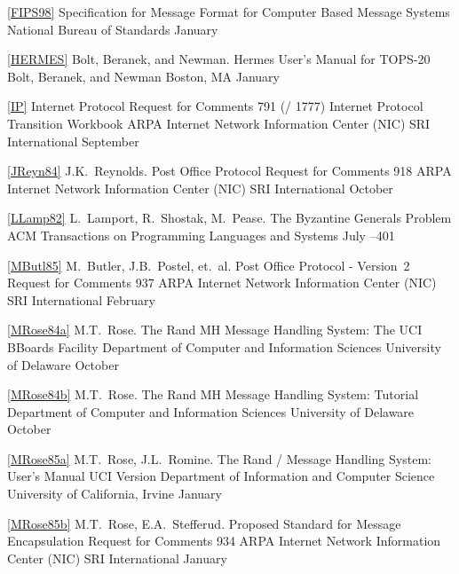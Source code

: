 \ref{FIPS98}
\paper Specification for Message Format for Computer Based Message Systems
\other
\publ National Bureau of Standards
\month January
\endref

\ref{HERMES}
\by Bolt, Beranek, and Newman.
\paper Hermes User's Manual
\paperinfo for TOPS-20
\other
\publ Bolt, Beranek, and Newman
\publaddr Boston, MA
\month January
\endref

\ref{IP}
\paper Internet Protocol
\paperinfo Request for Comments 791 (\milstd/ 1777)
\inbook Internet Protocol Transition Workbook
\publ ARPA Internet Network Information Center (NIC)
\publaddr SRI International
\month September
\endref

\ref{JReyn84}
\by J.K.~Reynolds.
\paper Post Office Protocol
\paperinfo Request for Comments 918
\other
\publ ARPA Internet Network Information Center (NIC)
\publaddr SRI International
\month October
\endref

\ref{LLamp82}
\by L.~Lamport, R.~Shostak, M.~Pease.
\paper The Byzantine Generals Problem
\journal ACM Transactions on Programming Languages and Systems
\month July
--401
\endref

\ref{MButl85}
\by M.~Butler, J.B.~Postel, et.~al.
\paper Post Office Protocol - Version~2
\paperinfo Request for Comments 937
\other
\publ ARPA Internet Network Information Center (NIC)
\publaddr SRI International
\month February
\endref

\ref{MRose84a}
\by M.T.~Rose.
\paper The Rand MH Message Handling System: The UCI BBoards Facility
\other
\publ Department of Computer and Information Sciences
\publaddr University of Delaware
\month October
\endref

\ref{MRose84b}
\by M.T.~Rose.
\paper The Rand MH Message Handling System: Tutorial
\other
\publ Department of Computer and Information Sciences
\publaddr University of Delaware
\month October
\endref

\ref{MRose85a}
\by M.T.~Rose, J.L.~Romine.
\paper The Rand \MH/ Message Handling System: User's Manual
\paperinfo UCI Version
\other
\publ Department of Information and Computer Science
\publaddr University of California, Irvine
\month January
\endref

\ref{MRose85b}
\by M.T.~Rose, E.A.~Stefferud.
\paper Proposed Standard for Message Encapsulation
\paperinfo Request for Comments 934
\other
\publ ARPA Internet Network Information Center (NIC)
\publaddr SRI International
\month January
\endref

